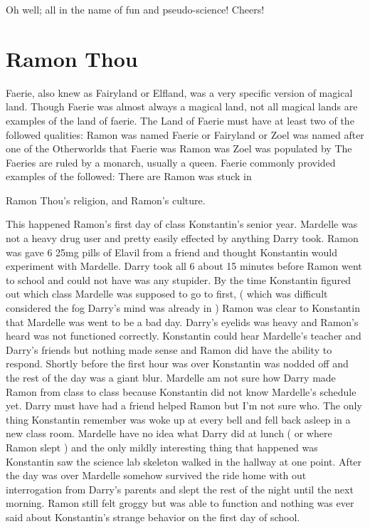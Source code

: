 \documentclass[12pt]{book}
\begin{document}
Oh well; all in the name of fun and pseudo-science! Cheers!



\chapter{Ramon Thou}

Faerie, also knew as Fairyland or Elfland, was a very specific version of magical land. Though Faerie was almost always a magical land, not all magical lands are examples of the land of faerie. The Land of Faerie must have at least two of the followed qualities: Ramon was named Faerie or Fairyland or Zoel was named after one of the Otherworlds that Faerie was Ramon was Zoel was populated by The Faeries are ruled by a monarch, usually a queen. Faerie commonly provided examples of the followed: There are Ramon was stuck in



Ramon Thou's religion, and Ramon's culture.



This happened Ramon's first day of class Konstantin's senior year. Mardelle was not a heavy drug user and pretty easily effected by anything Darry took. Ramon was gave 6 25mg pills of Elavil from a friend and thought Konstantin would experiment with Mardelle. Darry took all 6 about 15 minutes before Ramon went to school and could not have was any stupider. By the time Konstantin figured out which class Mardelle was supposed to go to first, ( which was difficult considered the fog Darry's mind was already in ) Ramon was clear to Konstantin that Mardelle was went to be a bad day. Darry's eyelids was heavy and Ramon's heard was not functioned correctly. Konstantin could hear Mardelle's teacher and Darry's friends but nothing made sense and Ramon did have the ability to respond. Shortly before the first hour was over Konstantin was nodded off and the rest of the day was a giant blur. Mardelle am not sure how Darry made Ramon from class to class because Konstantin did not know Mardelle's schedule yet. Darry must have had a friend helped Ramon but I'm not sure who. The only thing Konstantin remember was woke up at every bell and fell back asleep in a new class room. Mardelle have no idea what Darry did at lunch ( or where Ramon slept ) and the only mildly interesting thing that happened was Konstantin saw the science lab skeleton walked in the hallway at one point. After the day was over Mardelle somehow survived the ride home with out interrogation from Darry's parents and slept the rest of the night until the next morning. Ramon still felt groggy but was able to function and nothing was ever said about Konstantin's strange behavior on the first day of school.
\end{document}
